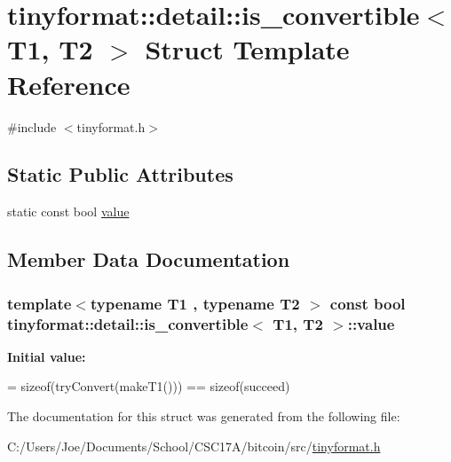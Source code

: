 \hypertarget{structtinyformat_1_1detail_1_1is__convertible}{}\section{tinyformat\+:\+:detail\+:\+:is\+\_\+convertible$<$ T1, T2 $>$ Struct Template Reference}
\label{structtinyformat_1_1detail_1_1is__convertible}


{\ttfamily \#include $<$tinyformat.\+h$>$}

\subsection*{Static Public Attributes}
\begin{DoxyCompactItemize}
\item 
static const bool \hyperlink{structtinyformat_1_1detail_1_1is__convertible_a399ca4333bd68f88a5d5a2430f804df2}{value}
\end{DoxyCompactItemize}


\subsection{Member Data Documentation}
\hypertarget{structtinyformat_1_1detail_1_1is__convertible_a399ca4333bd68f88a5d5a2430f804df2}{}
\subsubsection[{value}]{\setlength{\rightskip}{0pt plus 5cm}template$<$typename T1 , typename T2 $>$ const bool {\bf tinyformat\+::detail\+::is\+\_\+convertible}$<$ T1, T2 $>$\+::value\hspace{0.3cm}{\ttfamily [static]}}\label{structtinyformat_1_1detail_1_1is__convertible_a399ca4333bd68f88a5d5a2430f804df2}
{\bfseries Initial value\+:}
\begin{DoxyCode}
=
            \textcolor{keyword}{sizeof}(tryConvert(makeT1())) == \textcolor{keyword}{sizeof}(succeed)
\end{DoxyCode}


The documentation for this struct was generated from the following file\+:\begin{DoxyCompactItemize}
\item 
C\+:/\+Users/\+Joe/\+Documents/\+School/\+C\+S\+C17\+A/bitcoin/src/\hyperlink{tinyformat_8h}{tinyformat.\+h}\end{DoxyCompactItemize}
